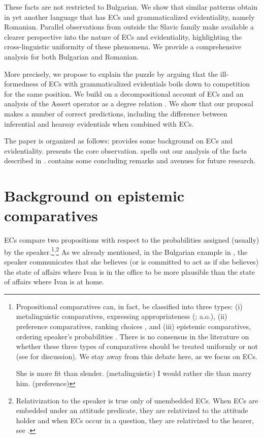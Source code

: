 \documentclass[output=paper,
]{langscibook}
\begin{document}
\noindent These facts are not restricted to Bulgarian. We show that similar patterns obtain in yet another language that has ECs and grammaticalized evidentiality, namely Romanian. Parallel observations from outside the Slavic family make available a clearer perspective into the nature of ECs and evidentiality, highlighting the cross-linguistic uniformity of these phenomena. We provide a comprehensive analysis for both Bulgarian and Romanian. 

More precisely, we propose to explain the puzzle by arguing that the ill-formed\-ness of ECs with grammaticalized evidentials boils down to competition for the same position. We build on a decompositional account of ECs \citep{herrub14} and an analysis of the Assert operator as a degree relation \citep{grewol17}. We show that our proposal makes a number of correct predictions, including  the difference between inferential and hearsay evidentials when combined with ECs. 

The paper is organized as follows:  provides some background on ECs and evidentiality.  presents the core observation.  spells out our analysis of the facts described in  .  contains some concluding remarks and avenues for future research. 


\section{Background on epistemic comparatives}\label{background}
ECs compare two propositions with respect to the probabilities assigned (usually) by the speaker.\footnote{Propositional comparatives can, in fact, be classified into three types: (i) metalinguistic comparatives, expressing appropriateness (\citealt{bre73,mcc88,emb07,mor11}; a.o.), (ii) preference comparatives, ranking choices \citep{giasta09,giayoo11}, and (iii) epistemic comparatives, ordering speaker's probabilities \citep{finkra14,herrub14}. There is no consensus in the literature on whether these three types of comparatives should be treated uniformly or not (see \citealt{mor11} for discussion). We stay away from this debate here, as we focus on ECs. 

	\ea \ea She is more fit than slender. \hfill (metalinguistic)
	\ex I would rather die than marry him. \hfill (preference)
    \z \z
}\textsuperscript{,}\footnote{Relativization to the speaker is true only of unembedded ECs. When ECs are embedded under an attitude predicate, they are relativized to the attitude holder and when ECs occur in a question, they are relativized to the hearer, see \cite[562]{herrub14}.\label{fn:relativ}
} 
As we already mentioned, in the Bulgarian example in , the speaker communicates that she believes (or is committed to act as if she believes) the state of affairs where Ivan is in the office to be more plausible than the state of affairs where Ivan is at home. 
\end{document}
